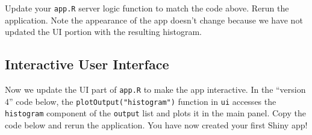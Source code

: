 \documentclass[
]{krantz}
\begin{document}
Update your \texttt{app.R} server logic function to match the code above. Rerun the application. Note the appearance of the app doesn't change because we have not updated the UI portion with the resulting histogram.

\hypertarget{interactive-user-interface}{%
\subsection{Interactive User Interface}\label{interactive-user-interface}}

Now we update the UI part of \texttt{app.R} to make the app interactive. In the ``version 4'' code below, the \texttt{plotOutput("histogram")} function in \texttt{ui} accesses the \texttt{histogram} component of the \texttt{output} list and plots it in the main panel. Copy the code below and rerun the application. You have now created your first Shiny app!
\end{document}

